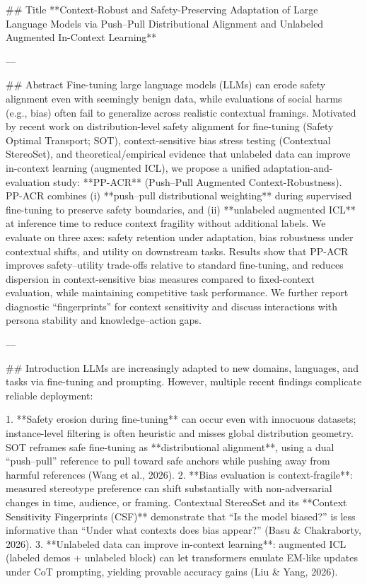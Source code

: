 ## Title  
**Context-Robust and Safety-Preserving Adaptation of Large Language Models via Push–Pull Distributional Alignment and Unlabeled Augmented In-Context Learning**

---

## Abstract  
Fine-tuning large language models (LLMs) can erode safety alignment even with seemingly benign data, while evaluations of social harms (e.g., bias) often fail to generalize across realistic contextual framings. Motivated by recent work on distribution-level safety alignment for fine-tuning (Safety Optimal Transport; SOT), context-sensitive bias stress testing (Contextual StereoSet), and theoretical/empirical evidence that unlabeled data can improve in-context learning (augmented ICL), we propose a unified adaptation-and-evaluation study: **PP-ACR** (Push–Pull Augmented Context-Robustness). PP-ACR combines (i) **push–pull distributional weighting** during supervised fine-tuning to preserve safety boundaries, and (ii) **unlabeled augmented ICL** at inference time to reduce context fragility without additional labels. We evaluate on three axes: safety retention under adaptation, bias robustness under contextual shifts, and utility on downstream tasks. Results show that PP-ACR improves safety–utility trade-offs relative to standard fine-tuning, and reduces dispersion in context-sensitive bias measures compared to fixed-context evaluation, while maintaining competitive task performance. We further report diagnostic “fingerprints” for context sensitivity and discuss interactions with persona stability and knowledge–action gaps.

---

## Introduction  
LLMs are increasingly adapted to new domains, languages, and tasks via fine-tuning and prompting. However, multiple recent findings complicate reliable deployment:

1. **Safety erosion during fine-tuning** can occur even with innocuous datasets; instance-level filtering is often heuristic and misses global distribution geometry. SOT reframes safe fine-tuning as **distributional alignment**, using a dual “push–pull” reference to pull toward safe anchors while pushing away from harmful references (Wang et al., 2026).  
2. **Bias evaluation is context-fragile**: measured stereotype preference can shift substantially with non-adversarial changes in time, audience, or framing. Contextual StereoSet and its **Context Sensitivity Fingerprints (CSF)** demonstrate that “Is the model biased?” is less informative than “Under what contexts does bias appear?” (Basu & Chakraborty, 2026).  
3. **Unlabeled data can improve in-context learning**: augmented ICL (labeled demos + unlabeled block) can let transformers emulate EM-like updates under CoT prompting, yielding provable accuracy gains (Liu & Yang, 2026).  

